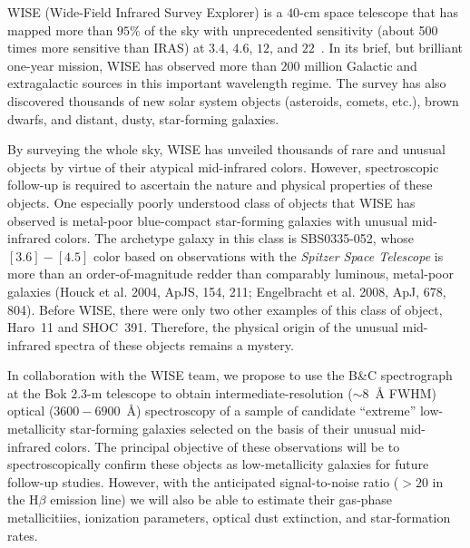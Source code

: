 WISE (Wide-Field Infrared Survey Explorer) is a $40$-cm space
telescope that has mapped more than $95\%$ of the sky with
unprecedented sensitivity (about 500 times more sensitive than IRAS)
at $3.4$, $4.6$, $12$, and $22$~\micron.  In its brief, but brilliant
one-year mission, WISE has observed more than $200$ million Galactic
and extragalactic sources in this important wavelength regime.  The
survey has also discovered thousands of new solar system objects
(asteroids, comets, etc.), brown dwarfs, and distant, dusty,
star-forming galaxies.

By surveying the whole sky, WISE has unveiled thousands of rare and
unusual objects by virtue of their atypical mid-infrared colors.
However, spectroscopic follow-up is required to ascertain the nature
and physical properties of these objects.  One especially poorly
understood class of objects that WISE has observed is metal-poor
blue-compact star-forming galaxies with unusual mid-infrared colors.
The archetype galaxy in this class is SBS0335-052, whose $[3.6]-[4.5]$
color based on observations with the {\em Spitzer Space Telescope} is
more than an order-of-magnitude redder than comparably luminous,
metal-poor galaxies (Houck et al. 2004, ApJS, 154, 211; Engelbracht et
al. 2008, ApJ, 678, 804).  Before WISE, there were only two other
examples of this class of object, Haro~11 and SHOC~391.  Therefore,
the physical origin of the unusual mid-infrared spectra of these
objects remains a mystery.

In collaboration with the WISE team, we propose to use the B\&C
spectrograph at the Bok $2.3$-m telescope to obtain
intermediate-resolution ($\sim8$~\AA{} FWHM) optical ($3600-6900$~\AA)
spectroscopy of a sample of candidate ``extreme'' low-metallicity
star-forming galaxies selected on the basis of their unusual
mid-infrared colors.  The principal objective of these observations
will be to spectroscopically confirm these objects as low-metallicity
galaxies for future follow-up studies.  However, with the anticipated
signal-to-noise ratio ($>20$ in the H$\beta$ emission line) we will
also be able to estimate their gas-phase metallicitiies, ionization
parameters, optical dust extinction, and star-formation rates.  
